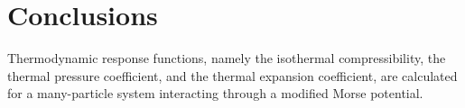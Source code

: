 \documentclass[12pt]{article}
\begin{document}
	\section{Conclusions}
	Thermodynamic response functions, namely the isothermal compressibility, the thermal pressure coefficient, and the thermal expansion coefficient, are calculated for a many-particle system interacting through a modified Morse potential.
	
	
	
	
\end{document}
